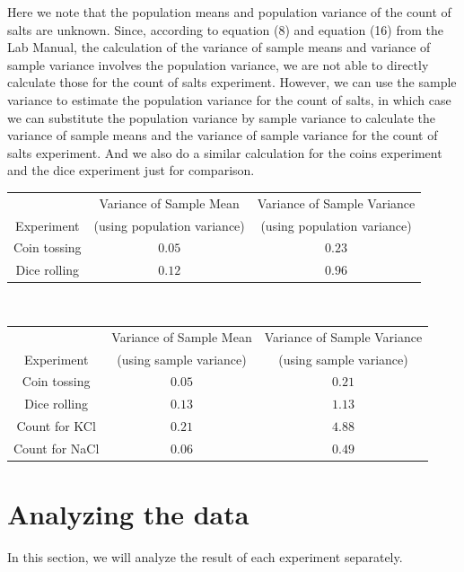 \documentclass[11pt]{book}
\theoremstyle{break}
\theoremstyle{break}
\begin{document}
\newpage
Here we note that the population means and population variance of the count of salts are unknown. Since, according to equation (8) and equation (16) from the Lab Manual, the calculation of the variance of sample means and variance of sample variance involves the population variance, we are not able to directly calculate those for the count of salts experiment. However, we can use the sample variance to estimate the population variance for the count of salts, in which case we can substitute the population variance by sample variance to calculate the variance of sample means and the variance of sample variance for the count of salts experiment. And we also do a similar calculation for the coins experiment and the dice experiment just for comparison. 
\begin{center}
\begin{tabular}{|c|c|c|}
\hline 
${\ }$ & Variance of Sample Mean & Variance of Sample Variance \\
Experiment & (using population variance)& (using population variance) \\
\hline
Coin tossing & $0.05$ & $0.23$ \\
\hline 
Dice rolling & $0.12$ & $0.96$ \\
\hline
\end{tabular}\\
\hfill\break
\hfill\break
\begin{tabular}{|c|c|c|}
\hline 
${\ }$ & Variance of Sample Mean & Variance of Sample Variance \\
Experiment & (using sample variance) &  (using sample variance) \\
\hline
Coin tossing & $0.05$ & $0.21$ \\
\hline 
Dice rolling & $0.13$ & $1.13$ \\
\hline
Count for KCl & $0.21$ & $4.88$ \\
\hline
Count for NaCl & $0.06$ & $0.49$ \\
\hline
\end{tabular}
\end{center}

\hfill\break
\hfill\break
\hfill\break


\section{Analyzing the data}
In this section, we will analyze the result of each experiment separately.\\
\end{document}
